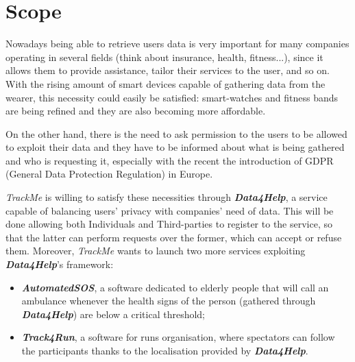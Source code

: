 \section{Scope}
    Nowadays being able to retrieve users data is very important for many companies operating in several fields (think about insurance, health, fitness...), since it allows them to provide assistance, tailor their services to the user, and so on. With the rising amount of smart devices capable of gathering data from the wearer, this necessity could easily be satisfied: smart-watches and fitness bands are being refined and they are also becoming more affordable.
    
    On the other hand, there is the need to ask permission to the users to be allowed to exploit their data and they have to be informed about what is being gathered and who is requesting it, especially with the recent the introduction of GDPR (General Data Protection Regulation) in Europe.
    
    \emph{TrackMe} is willing to satisfy these necessities through \textbf{\emph{Data4Help}}, a service capable of balancing users' privacy with companies' need of data. This will be done allowing both Individuals and Third-parties to register to the service, so that the latter can perform requests over the former, which can accept or refuse them.
    Moreover, \emph{TrackMe} wants to launch two more services exploiting \textbf{\emph{Data4Help}}'s framework:
    \begin{itemize}
        \item \textbf{\emph{AutomatedSOS}}, a software dedicated to elderly people that will call an ambulance whenever the health signs of the person (gathered through \textbf{\emph{Data4Help}}) are below a critical threshold;
        \item \textbf{\emph{Track4Run}}, a software for runs organisation, where spectators can follow the participants thanks to the localisation provided by \textbf{\emph{Data4Help}}.
    \end{itemize}